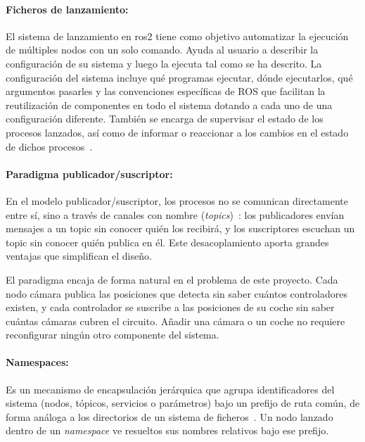 \paragraph{Ficheros de lanzamiento:}
\label{sec:ros2-launch}

El sistema de lanzamiento en \gls{ros2} tiene como objetivo automatizar la ejecución de múltiples nodos con un solo comando. Ayuda al usuario a describir la configuración de su sistema y luego la ejecuta tal como se ha descrito. La configuración del sistema incluye qué programas ejecutar, dónde ejecutarlos, qué argumentos pasarles y las convenciones específicas de ROS que facilitan la reutilización de componentes en todo el sistema dotando a cada uno de una configuración diferente. También se encarga de supervisar el estado de los procesos lanzados, así como de informar o reaccionar a los cambios en el estado de dichos procesos~\cite{ros2launch}.

\paragraph{Paradigma publicador/suscriptor:}
\label{sec:pubsub}

En el modelo publicador/suscriptor, los procesos no se comunican directamente entre sí, sino a través de canales con nombre (\textit{topics})~\cite{ros2topics}: los publicadores envían mensajes a un topic sin conocer quién los recibirá, y los suscriptores escuchan un topic sin conocer quién publica en él. Este desacoplamiento aporta grandes ventajas que simplifican el diseño.

El paradigma encaja de forma natural en el problema de este proyecto. Cada nodo cámara publica las posiciones que detecta sin saber cuántos controladores existen, y cada controlador se suscribe a las posiciones de su coche sin saber cuántas cámaras cubren el circuito. Añadir una cámara o un coche no requiere reconfigurar ningún otro componente del sistema.

\paragraph{Namespaces:}
\label{sec:ros2-namespaces}
Es un mecanismo de encapsulación jerárquica que agrupa identificadores del sistema (nodos, tópicos, servicios o parámetros) bajo un prefijo de ruta común, de forma análoga a los directorios de un sistema de ficheros~\cite{ros2names}. Un nodo lanzado dentro de un \textit{namespace} ve resueltos sus nombres relativos bajo ese prefijo.

